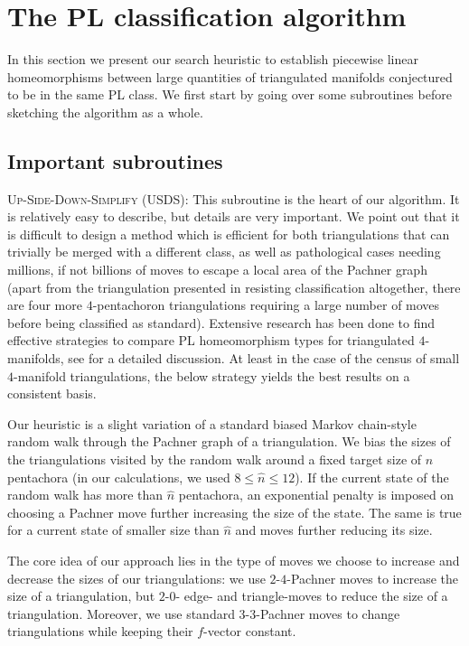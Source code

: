 \documentclass[pdflatex,sn-mathphys-num]{sn-jnl}
\theoremstyle{thmstyleone}%
\theoremstyle{thmstyletwo}%
\theoremstyle{thmstylethree}%
\theoremstyle{remark}
\begin{document}
\section{The PL classification algorithm}
\label{sec:pl}

In this section we present our search heuristic to establish piecewise linear homeomorphisms between large quantities of triangulated manifolds conjectured to be in the same PL class. We first start by going over some subroutines before sketching the algorithm as a whole.

\subsection{Important subroutines}

\textsc{Up-Side-Down-Simplify} (USDS): This subroutine is the heart of our algorithm. It is relatively easy to describe, but details are very important. We point out that it is difficult to design a method which is efficient for both triangulations that can trivially be merged with a different class, as well as pathological cases needing millions, if not billions of moves to escape a local area of the Pachner graph (apart from the triangulation presented in  resisting classification altogether, there are four more $4$-pentachoron triangulations requiring a large number of moves before being classified as standard). Extensive research has been done to find effective strategies to compare PL homeomorphism types for triangulated $4$-manifolds, see  for a detailed discussion. At least in the case of the census of small $4$-manifold triangulations, the below strategy yields the best results on a consistent basis.

Our heuristic is a slight variation of a standard biased Markov chain-style random walk through the Pachner graph of a triangulation. We bias the sizes of the triangulations visited by the random walk around a fixed target size of $\hat{n}$ pentachora (in our calculations, we used $8 \leq \hat{n} \leq 12$). If the current state of the random walk has more than $\hat{n}$ pentachora, an exponential penalty is imposed on choosing a Pachner move further increasing the size of the state. The same is true for a current state of smaller size than $\hat{n}$ and moves further reducing its size.

The core idea of our approach lies in the type of moves we choose to increase and decrease the sizes of our triangulations: we use $2$-$4$-Pachner moves to increase the size of a triangulation, but $2$-$0$- edge- and triangle-moves to reduce the size of a triangulation. Moreover, we use standard $3$-$3$-Pachner moves to change triangulations while keeping their $f$-vector constant. 
\end{document}
